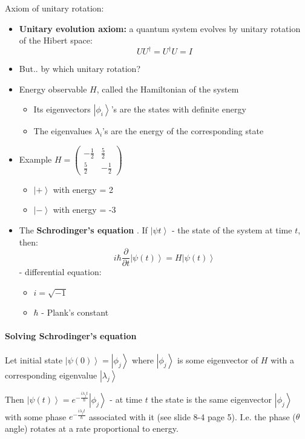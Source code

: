 \documentclass{scrartcl}
\newcommand{\ket}[1]{\left| #1 \right>} %
\begin{document}
Axiom of unitary rotation:
\begin{itemize}
\item {\bf Unitary evolution axiom:} a quantum system evolves by unitary
  rotation of the Hibert space: $$U U^\dag = U^\dag U = I$$
\item But.. by which unitary rotation?
\item Energy observable $H$, called the Hamiltonian of the
  system \begin{itemize}
  \item Its eigenvectors $\ket{\phi_i}$'s are the states with definite energy
  \item The eigenvalues $\lambda_i$'s are the energy of the corresponding state
  \end{itemize}
\item Example $H = \begin{pmatrix} -\frac12 & \frac52 \\ \frac52 &
    -\frac12 \end{pmatrix}$
  \begin{itemize}
  \item $\ket+$ with energy = 2
  \item $\ket-$ with energy = -3
  \end{itemize}
\item The {\bf Schrodinger's equation }. If $\ket{\psi{t}}$ - the state of the
  system at time $t$, then:
$$i\hbar \frac\partial{\partial t}\ket{\psi(t)} = H\ket{\psi(t)}$$
- differential equation:
\begin{itemize}
\item $i = \sqrt{-1}$
\item $\hbar$ - Plank's constant
\end{itemize}
\end{itemize}

\paragraph{Solving Schrodinger's equation}

Let initial state $\ket{\psi(0)} = \ket{\phi_j}$ where $\ket{\phi_j}$ is some
eigenvector of $H$ with a corresponding eigenvalue $\ket{\lambda_j}$

Then $\ket{\psi(t)} = e^{-\frac{i\lambda_j t}{\hbar}} \ket{\phi_j}$ - at time
$t$ the state is the same eigenvector $\ket{\phi_j}$ with some phase
$e^{-\frac{i\lambda_j t}{\hbar}}$ associated with it (see slide 8-4 page 5).
I.e. the phase ($\theta$ angle) rotates at a rate proportional to energy.
\end{document}
